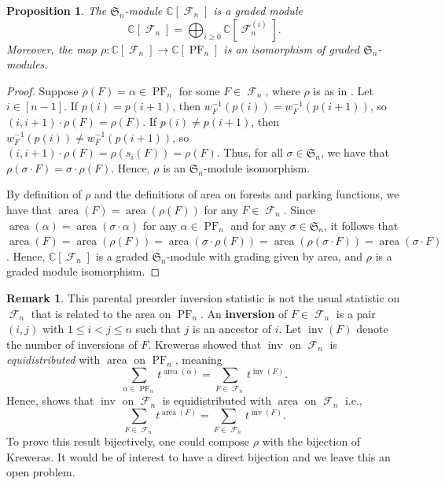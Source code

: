 \documentclass{amsart}
\renewcommand{\S}{\mathfrak{S}}
\newcommand{\CC}{\mathbb{C}}
\DeclareMathOperator{\inv}{inv}
\DeclareMathOperator{\area}{area}
\DeclareMathOperator{\PF}{PF}
\newcommand{\defterm}{\textbf}
\DeclareMathOperator{\F}{\mathcal{F}}
\newtheorem{proposition}[theorem]{Proposition}
\theoremstyle{definition}
\newtheorem{remark}[theorem]{Remark}
\begin{document}
\begin{proposition}\label{isomorphism-Sn-module}
    The $\S_n$-module $\CC[\F_n]$ is a graded module
    \[\CC[\F_n]=\bigoplus_{i\geq 0}\CC[\F_{n}^{(i)}].
    \]
    Moreover, the map $\rho:\CC[\F_n]\to \CC[\PF_n]$ is an isomorphism of graded $\S_n$-modules.
\end{proposition}

\begin{proof}
    Suppose $\rho(F)=\alpha\in \PF_n$ for some $F\in \F_n$, where $\rho$ is as in . Let $i\in [n-1]$. If $p(i)= p(i+1)$, then $w_F^{-1}(p(i))=w_F^{-1}(p(i+1))$, so $(i,i+1)\cdot \rho(F)=\rho(F)$. 
    If $p(i)\neq p(i+1)$, then $w_F^{-1}(p(i))\neq w_F^{-1}(p(i+1))$, so $(i,i+1)\cdot \rho(F)=\rho(s_i(F))=\rho(F)$. 
    Thus, for all $\sigma\in \S_n$, we have that $\rho(\sigma\cdot F)=\sigma\cdot \rho(F)$. Hence, $\rho$ is an $\S_n$-module isomorphism.

    By definition of $\rho$ and the definitions of area on forests and parking functions, we have that $\area(F)=\area(\rho(F))$ for any $F\in \F_n$. 
    Since $\area(\alpha)=\area(\sigma\cdot \alpha)$ for any $\alpha\in \PF_n$ and for any $\sigma\in\S_n$, it follows that $\area(F)=\area(\rho(F))=\area(\sigma\cdot \rho(F))=\area(\rho(\sigma\cdot F))=\area(\sigma\cdot F)$. 
    Hence, $\CC[\F_n]$ is a graded $\S_n$-module with grading given by area, and $\rho$ is a graded module isomorphism.
\end{proof}

   \begin{remark}This parental preorder inversion statistic is not the usual statistic on $\F_n$ that is related to the area on $\PF_n$. An \defterm{inversion} of $F\in \F_n$ is a pair $(i,j)$ with $1\leq i<j\leq n$ such that $j$ is an ancestor of $i$. Let $\inv(F)$ denote the number of inversions of $F$. 
    Kreweras \cite{kreweras1980famille} showed that $\inv$ on $\F_n$ is \textit{equidistributed} with $\area$ on $\PF_n$, meaning
    \[\sum_{\alpha\in \PF_n}t^{\area(\alpha)}=\sum_{F\in \F_n}t^{\inv(F)}.\]Hence,  shows that $\inv$ on $\F_n$ is equidistributed with $\area$ on $\F_n$ i.e.,
       \begin{equation}
        \sum_{F\in \F_n}t^{\area(F)}=\sum_{F\in \F_n}t^{\inv(F)}.
        \end{equation}
        To prove this result bijectively, one could compose $\rho$ with the bijection of Kreweras. It would be of interest to have a direct bijection and we leave this an open problem.
    \end{remark}
\end{document}
